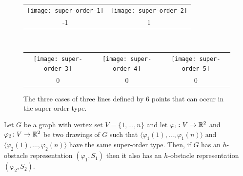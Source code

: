 \documentclass{patmorin}
\begin{document}
\begin{figure}[htbp]
  \begin{center}
    \begin{tabular}{cc}
       \texttt{[image: super-order-1]} &
       \texttt{[image: super-order-2]} \\ 
       -1 & 1 \\
    \end{tabular}\\[4ex]
    \begin{tabular}{ccc}
       \texttt{[image: super-order-3]} &
       \texttt{[image: super-order-4]} &
       \texttt{[image: super-order-5]} \\
       0 & 0 & 0
    \end{tabular}
  \end{center}
  \caption{The three cases of three lines defined by 6 points that can
      occur in the super-order type.}
\end{figure}

\begin{lem}
  Let $G$ be a graph with vertex set $V=\{1,\ldots,n\}$ and let
  $\varphi_1\colon V\to\mathbb{R}^2$ and $\varphi_2\colon V\to\mathbb{R}^2$ be two drawings
  of $G$ such that $\langle\varphi_1(1),\ldots,\varphi_1(n)\rangle$
  and $\langle\varphi_2(1),\ldots,\varphi_2(n)\rangle$ have the same
  super-order type.  Then, if $G$ has an $h$-obstacle representation
  $(\varphi_1,S_1)$ then it also has an $h$-obstacle representation
  $(\varphi_2,S_2)$.
\end{lem}
\end{document}
